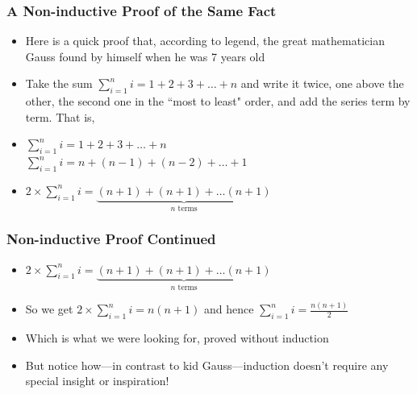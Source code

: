  \begin{frame}
\frametitle{A Non-inductive Proof of the Same Fact}

\begin{itemize}[<+->]
\item Here is a quick proof that, according to legend, the great mathematician Gauss found by himself when he was 7 years old

\item Take the sum  $\displaystyle\sum_{i=1}^n i = 1 + 2 + 3 + \ldots + n$ and write it twice, one above the other, the second one in the ``most to least" order, and add the series term by term. That is, %

\item  $\displaystyle\sum_{i=1}^n i = 1 + 2 + 3 + \ldots + n$\\
 {\underline{$\displaystyle\sum_{i=1}^n i = n + (n-1) + (n-2) + \ldots + 1$}}\\
 
\item[] $2 \times \displaystyle\sum_{i=1}^n i = \underbrace{(n+1) + (n+1) + \ldots (n+1)}_{n \text{ terms}} $ %


\end{itemize} 
\end{frame}

 \begin{frame}
\frametitle{Non-inductive Proof Continued}

\begin{itemize}[<+->]

\item $2 \times \displaystyle\sum_{i=1}^n i = \underbrace{(n+1) + (n+1) + \ldots (n+1)}_{n \text{ terms}} $ %

\item So we get $2 \times \displaystyle\sum_{i=1}^n i = n(n+1)$ and hence $\displaystyle\sum_{i=1}^n i =\frac{n(n+1)}{2}$

\item Which is what we were looking for, proved without induction

\item But notice how---in contrast to kid Gauss---induction doesn't require any special insight or inspiration! 

\end{itemize} 
\end{frame}


